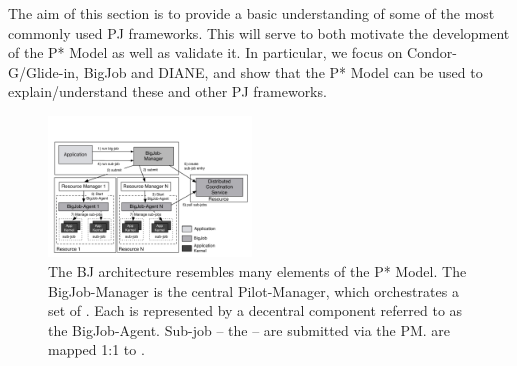 \documentclass[conference]{IEEEtran}
\begin{document}

The aim of this section is to provide a basic understanding of some of
the most commonly used PJ frameworks. This will serve to both
motivate the development of the P* Model as well as validate it.  In
particular, we focus on Condor-G/Glide-in, BigJob and DIANE, and show
that the P* Model can be used to explain/understand these and
other PJ frameworks.



\begin{figure}[t]
	\up\up\up
	\centering
	\includegraphics[width=0.48\textwidth]{../figures/re_bigjob_interactions.pdf}
	\caption{ The
          BJ architecture resembles many elements of the P* Model. The
          BigJob-Manager is the central Pilot-Manager, which
          orchestrates a set of \pilots. Each \pilot is represented by a
          decentral component referred to as the BigJob-Agent. Sub-job
          -- the \cus -- are submitted via the PM. \cus are mapped 1:1
          to \sus.\up\up}
	\label{fig:figures_re_bigjob_interactions}
\end{figure}
\end{document}
